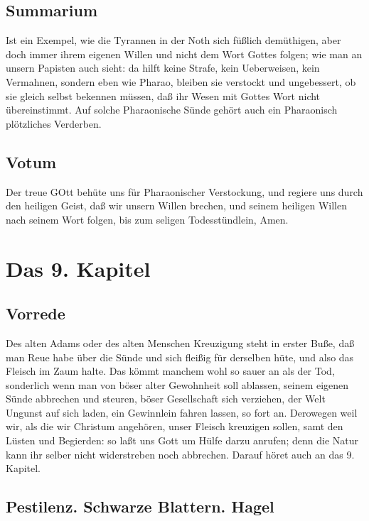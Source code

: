 \section{Summarium}

Ist ein Exempel, wie die Tyrannen in der Noth sich füßlich demüthigen, aber doch immer ihrem eigenen Willen und nicht dem Wort Gottes folgen; wie man an unsern Papisten auch sieht: da hilft keine Strafe, kein Ueberweisen, kein Vermahnen, sondern eben wie Pharao, bleiben sie verstockt und ungebessert, ob sie gleich selbst bekennen müssen, daß ihr Wesen mit Gottes Wort nicht übereinstimmt. Auf solche Pharaonische Sünde gehört auch ein Pharaonisch plötzliches Verderben.

\section{Votum}

Der treue GOtt behüte uns für Pharaonischer Verstockung, und regiere uns durch den heiligen Geist, daß wir unsern Willen brechen, und seinem heiligen Willen nach seinem Wort folgen, bis zum seligen Todesstündlein, Amen.

\chapter{Das 9. Kapitel}

\section{Vorrede}

Des alten Adams oder des alten Menschen Kreuzigung steht in erster Buße, daß man Reue habe über die Sünde und sich fleißig für derselben hüte, und also das Fleisch im Zaum halte. Das kömmt manchem wohl so sauer an als der Tod, sonderlich wenn man von böser alter Gewohnheit soll ablassen, seinem eigenen
Sünde abbrechen und steuren, böser Gesellschaft sich verziehen, der Welt Ungunst auf sich laden, ein Gewinnlein fahren lassen, so fort an. Derowegen weil wir, als die wir Christum angehören, unser Fleisch kreuzigen sollen, samt den Lüsten und Begierden: so laßt uns Gott um Hülfe darzu anrufen; denn die Natur kann ihr selber nicht widerstreben noch abbrechen. Darauf höret auch an das 9. Kapitel.

\section{Pestilenz. Schwarze Blattern. Hagel}

